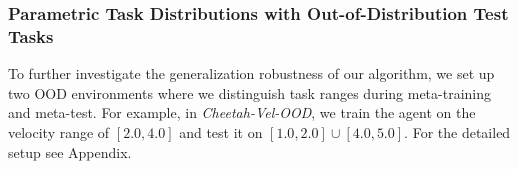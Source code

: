 \documentclass[letterpaper]{article} %
\begin{document}








\subsubsection{Parametric Task Distributions with Out-of-Distribution Test Tasks} To further investigate the generalization robustness of our algorithm, we set up two OOD environments where we distinguish task ranges during meta-training and meta-test. For example, in \emph{Cheetah-Vel-OOD}, we train the agent on the velocity range of $[2.0, 4.0]$ and test it on $[1.0, 2.0] \cup [4.0, 5.0]$.  For the detailed setup see Appendix.
\end{document}
